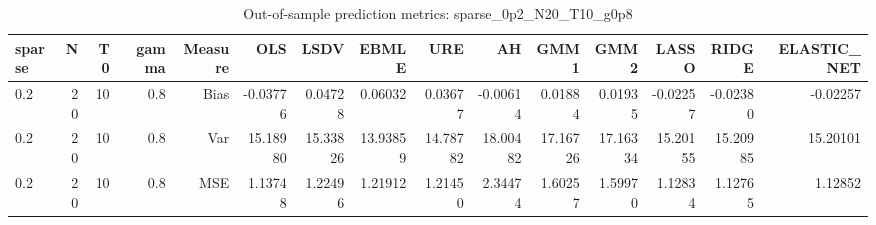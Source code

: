 \begin{table}[!htbp]\centering
\caption{Out-of-sample prediction metrics: sparse_0p2_N20_T10_g0p8}
\label{tab:table3_sparse_0p2_N20_T10_g0p8}
\begin{tabular}{lrrrrrrrrrrrrrr}
\hline
sparse & N & T0 & gamma & Measure & OLS & LSDV & EBMLE & URE & AH & GMM1 & GMM2 & LASSO & RIDGE & ELASTIC_NET \\
\hline
0.2 & 20 & 10 & 0.8 & Bias & -0.03776 & 0.04728 & 0.06032 & 0.03677 & -0.00614 & 0.01884 & 0.01935 & -0.02257 & -0.02380 & -0.02257 \\
0.2 & 20 & 10 & 0.8 & Var & 15.18980 & 15.33826 & 13.93859 & 14.78782 & 18.00482 & 17.16726 & 17.16334 & 15.20155 & 15.20985 & 15.20101 \\
0.2 & 20 & 10 & 0.8 & MSE & 1.13748 & 1.22496 & 1.21912 & 1.21450 & 2.34474 & 1.60257 & 1.59970 & 1.12834 & 1.12765 & 1.12852 \\
\hline
\end{tabular}
\end{table}

